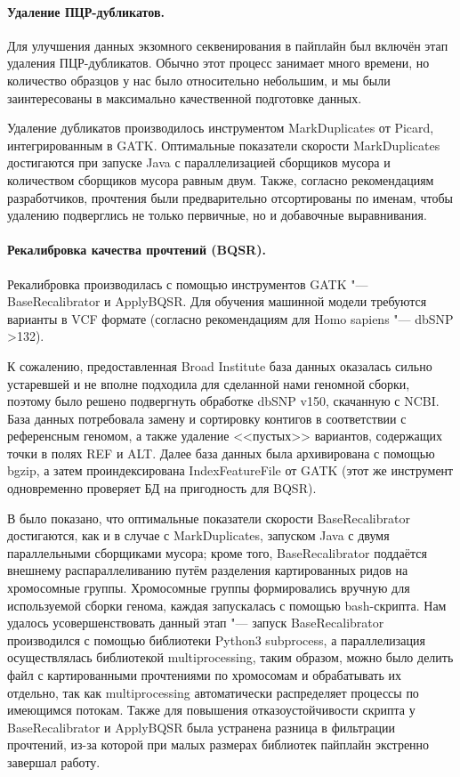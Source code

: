 \documentclass[a4paper,12pt]{article}
\begin{document}
\paragraph{Удаление ПЦР-дубликатов.}
Для улучшения данных экзомного секвенирования в пайплайн был включён этап удаления ПЦР-дубликатов.
Обычно этот процесс занимает много времени, но количество образцов у нас было относительно небольшим, и мы были заинтересованы в максимально качественной подготовке данных.

Удаление дубликатов производилось инструментом MarkDuplicates от Picard\cite{picard}, интегрированным в GATK.
Оптимальные показатели скорости MarkDuplicates достигаются при запуске Java с параллелизацией сборщиков мусора и количеством сборщиков мусора равным двум\cite{heldenbrand}.
Также, согласно рекомендациям разработчиков, прочтения были предварительно отсортированы по именам, чтобы удалению подверглись не только первичные, но и добавочные выравнивания\cite{gatk}.

\paragraph{Рекалибровка качества прочтений (BQSR).}
Рекалибровка производилась с помощью инструментов GATK "--- BaseRecalibrator и ApplyBQSR.
Для обучения машинной модели требуются варианты в VCF формате (согласно рекомендациям для Homo sapiens "--- dbSNP >132).

К сожалению, предоставленная Broad Institute база данных оказалась сильно устаревшей и не вполне подходила для сделанной нами геномной сборки, поэтому было решено подвергнуть обработке dbSNP v150, скачанную с NCBI\cite{dbsnp}.
База данных потребовала замену и сортировку контигов в соответствии с референсным геномом, а также удаление <<пустых>> вариантов, содержащих точки в полях REF и ALT.
Далее база данных была архивирована с помощью bgzip, а затем проиндексирована IndexFeatureFile от GATK (этот же инструмент одновременно проверяет БД на пригодность для BQSR).

В \cite{heldenbrand} было показано, что оптимальные показатели скорости BaseRecalibrator достигаются, как и в случае с MarkDuplicates, запуском Java с двумя параллельными сборщиками мусора;
кроме того, BaseRecalibrator поддаётся внешнему распараллеливанию путём разделения картированных ридов на хромосомные группы.
Хромосомные группы формировались вручную для используемой сборки генома, каждая запускалась с помощью bash-скрипта.
Нам удалось усовершенствовать данный этап "--- запуск BaseRecalibrator производился с помощью библиотеки Python3 subprocess, а параллелизация осуществлялась библиотекой multiprocessing, таким образом, можно было делить файл с картированными прочтениями по хромосомам и обрабатывать их отдельно, так как multiprocessing автоматически распределяет процессы по имеющимся потокам.
Также для повышения отказоустойчивости скрипта у BaseRecalibrator и ApplyBQSR была устранена разница в фильтрации прочтений, из-за которой при малых размерах библиотек пайплайн экстренно завершал работу.
\end{document}
